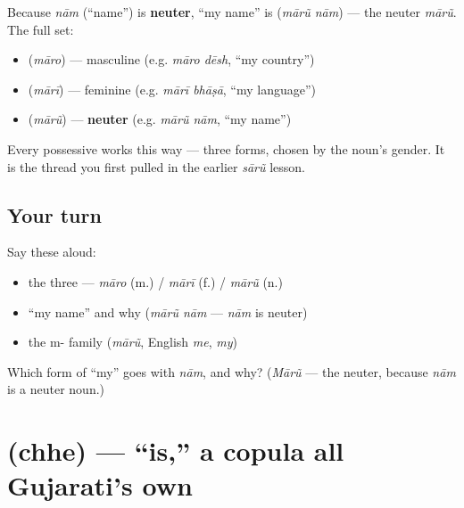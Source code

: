 \begin{grammarlens}[title={Grammar Lens: \textquotedblleft{}my\textquotedblright{} agrees in all three genders}]
Because \emph{nām} (\textquotedblleft{}name\textquotedblright{}) is \textbf{neuter}, \textquotedblleft{}my name\textquotedblright{} is \textbf{ } (\emph{mārũ nām}) — the neuter \emph{mārũ}. The full set:

\begin{itemize}
\raggedright
  \item \textbf{} (\emph{māro}) — masculine (e.g. \emph{māro dēsh}, \textquotedblleft{}my country\textquotedblright{})
  \item \textbf{} (\emph{mārī}) — feminine (e.g. \emph{mārī bhāṣā}, \textquotedblleft{}my language\textquotedblright{})
  \item \textbf{} (\emph{mārũ}) — \textbf{neuter} (e.g. \emph{mārũ nām}, \textquotedblleft{}my name\textquotedblright{})
\end{itemize}

Every possessive works this way — three forms, chosen by the noun's gender. It is the thread you first pulled in the earlier \emph{sārũ} lesson.
\end{grammarlens}

\subsection*{Your turn}
Say these aloud:

\begin{itemize}
\raggedright
  \item the three — \emph{māro} (m.) / \emph{mārī} (f.) / \emph{mārũ} (n.)
  \item \textquotedblleft{}my name\textquotedblright{} and why (\emph{mārũ nām} — \emph{nām} is neuter)
  \item the m- family (\emph{mārũ}, English \emph{me}, \emph{my})
\end{itemize}

\begin{tcolorbox}[breakable,colback=teal!4,colframe=teal!35!black,title={Before you move on}]
Which form of \textquotedblleft{}my\textquotedblright{} goes with \emph{nām}, and why? (\emph{Mārũ} — the neuter, because \emph{nām} is a neuter noun.)
\end{tcolorbox}
\section[\gu{છે}]{ (chhe) — \textquotedblleft{}is,\textquotedblright{} a copula all Gujarati's own}

